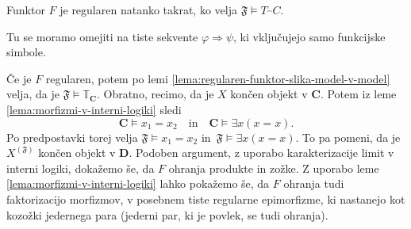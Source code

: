 \documentclass[../kategoricna_logika.tex]{subfiles}
\begin{document}
  \begin{lema}\label{lema:regularen-funktor-v-interni-logiki}
    Funktor $F$ je regularen natanko takrat, ko velja
    $\mathfrak{F} \models T_\cat{C}$.
  \end{lema}
  Tu se moramo omejiti na tiste sekvente $\varphi \Rightarrow \psi$, ki
  vključujejo samo funkcijske simbole.
  \begin{dokaz}
    Če je $F$ regularen, potem po lemi
    \ref{lema:regularen-funktor-slika-model-v-model} velja, da je
    $\mathfrak{F} \models \mathbb{T}_{\mathbf{C}}$.  Obratno, recimo,
    da je $X$ končen objekt v $\mathbf{C}$. Potem iz leme \ref{lema:morfizmi-v-interni-logiki}
    sledi
    \[ \mathbf{C} \models x_{1} = x_{2}\quad \text{in} \quad \mathbf{C} \models \exists x (x = x).\]
    Po predpostavki torej
    velja $\mathfrak{F} \models x_{1} = x_{2}$ in~${\mathfrak{F} \models \exists x (x = x)}$.
    To pa pomeni, da je
    $X^{(\mathfrak{F})}$ končen objekt v $\mathbf{D}$.  Podoben
    argument, z uporabo karakterizacije limit v interni logiki,
    dokažemo še, da $F$ ohranja produkte in zožke.  Z uporabo leme
    \ref{lema:morfizmi-v-interni-logiki} lahko pokažemo še, da $F$
    ohranja tudi faktorizacijo morfizmov, v posebnem tiste regularne
    epimorfizme, ki nastanejo kot kozožki jedernega para (jederni par,
    ki je povlek, se tudi ohranja).
  \end{dokaz}
%
\end{document}
